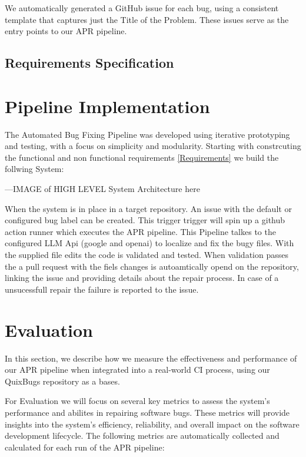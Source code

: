 We automatically generated a GitHub issue for each bug, using a consistent template that captures just the Title of the Problem. These issues serve as the entry points to our APR pipeline.

\subsection{Requirements Specification}

\section{Pipeline Implementation}
The Automated Bug Fixing Pipeline was developed using iterative prototyping and testing, with a focus on simplicity and modularity. Starting with constrcuting the functional and non functional requirements \ref{Requirements} we build the follwing System: 

---IMAGE of HIGH LEVEL System Architecture here

When the system is in place in a target repository. An issue with the default or configured bug label can be created. This trigger trigger will spin up a github action runner which executes the APR pipeline. This Pipeline talkes to the configured LLM Api (google and openai) to localize and fix the bugy files. With the supplied file edits the code is validated and tested. When validation passes the a pull request with the fiels changes is autoamtically opend on the repository, linking the issue and providing details about the repair process. In case of a unsucessfull repair the failure is reported to the issue.


\section{Evaluation}

In this section, we describe how we measure the effectiveness and performance of our APR pipeline when integrated into a real-world CI process, using our QuixBugs repository as a bases.

For Evaluation we will focus on several key metrics to assess the system's performance and abilites in repairing software bugs. These metrics will provide insights into the system's efficiency, reliability, and overall impact on the software development lifecycle. The following metrics are automatically collected and calculated for each run of the APR pipeline:


